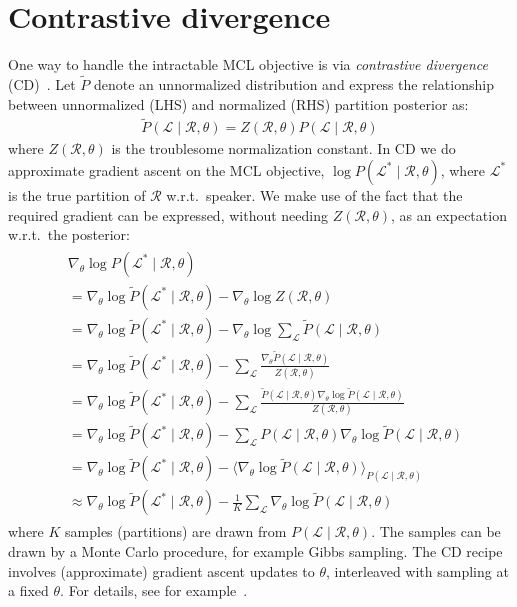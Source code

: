 \documentclass[a4paper,oneside,12pt,english]{report}
\def\expv#1#2{\bigl\langle#1\bigr\rangle_{#2}}
\def\Lset{\mathcal{L}}
\def\Rset{\mathcal{R}}
\begin{document}
\section{Contrastive divergence}
\label{sec:CD}
One way to handle the intractable MCL objective is via \emph{contrastive divergence} (CD)~\cite{cd,pcd}. Let $\tilde P$ denote an unnormalized distribution and express the relationship between unnormalized (LHS) and normalized (RHS) partition posterior as:
\begin{align}
\tilde P(\Lset\mid\Rset,\theta) = Z(\Rset,\theta)  P(\Lset\mid\Rset,\theta) 
\end{align}
where $Z(\Rset,\theta)$ is the troublesome normalization constant. In CD we do approximate gradient ascent on the MCL objective, $\log P(\Lset^*\mid\Rset,\theta)$, where $\Lset^*$ is the true partition of $\Rset$ w.r.t.\ speaker. We make use of the fact that the required gradient can be expressed, without needing $Z(\Rset,\theta)$, as an expectation w.r.t.\ the posterior:
\begin{align}
\label{eq:CD}
\begin{split}
&\nabla_\theta \log P(\Lset^*\mid\Rset,\theta) \\
&= \nabla_\theta \log\tilde P(\Lset^*\mid\Rset,\theta) - \nabla_\theta \log Z(\Rset,\theta) \\
&= \nabla_\theta \log\tilde P(\Lset^*\mid\Rset,\theta)
- \nabla_\theta \log \sum_\Lset \tilde P(\Lset\mid\Rset,\theta) \\
&= \nabla_\theta \log\tilde P(\Lset^*\mid\Rset,\theta)
-  \sum_\Lset \frac{\nabla_\theta\tilde P(\Lset\mid\Rset,\theta)}{Z(\Rset,\theta)} \\
&= \nabla_\theta \log\tilde P(\Lset^*\mid\Rset,\theta)
-  \sum_\Lset \frac{\tilde P(\Lset\mid\Rset,\theta)\nabla_\theta\log\tilde P(\Lset\mid\Rset,\theta)}{Z(\Rset,\theta)} \\
&= \nabla_\theta \log\tilde P(\Lset^*\mid\Rset,\theta)
-  \sum_\Lset P(\Lset\mid\Rset,\theta)\nabla_\theta\log\tilde P(\Lset\mid\Rset,\theta) \\
&= \nabla_\theta \log\tilde P(\Lset^*\mid\Rset,\theta)
- \expv{\nabla_\theta\log\tilde P(\Lset\mid\Rset,\theta)}{P(\Lset\mid\Rset,\theta)} \\
&\approx \nabla_\theta \log\tilde P(\Lset^*\mid\Rset,\theta)
- \frac1K\sum_{\Lset} \nabla_\theta\log\tilde P(\Lset\mid\Rset,\theta)\end{split}
\end{align}
where $K$ samples (partitions) are drawn from $P(\Lset\mid\Rset,\theta)$. The samples can be drawn by a Monte Carlo procedure, for example Gibbs sampling. The CD recipe involves (approximate) gradient ascent updates to $\theta$, interleaved with sampling at a fixed $\theta$. For details, see for example~\cite{pcd}.
\end{document}
